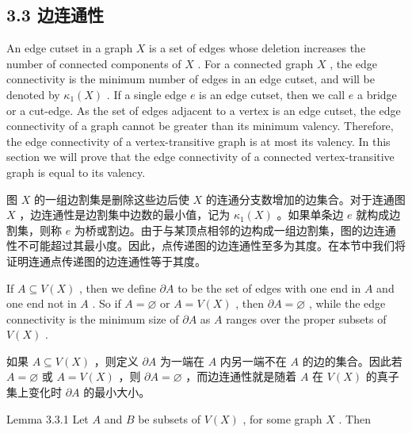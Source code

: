 \documentclass[10pt]{article}
\begin{document}
\begin{tcolorbox}\relax
\section*{3.3 边连通性}
\end{tcolorbox}

An edge cutset in a graph \(X\) is a set of edges whose deletion increases the number of connected components of \(X\) . For a connected graph \(X\) , the edge connectivity is the minimum number of edges in an edge cutset, and will be denoted by \({\kappa }_{1}\left( X\right)\) . If a single edge \(e\) is an edge cutset, then we call \(e\) a bridge or a cut-edge. As the set of edges adjacent to a vertex is an edge cutset, the edge connectivity of a graph cannot be greater than its minimum valency. Therefore, the edge connectivity of a vertex-transitive graph is at most its valency. In this section we will prove that the edge connectivity of a connected vertex-transitive graph is equal to its valency.

\begin{tcolorbox}\relax
图 \(X\) 的一组边割集是删除这些边后使 \(X\) 的连通分支数增加的边集合。对于连通图 \(X\) ，边连通性是边割集中边数的最小值，记为 \({\kappa }_{1}\left( X\right)\) 。如果单条边 \(e\) 就构成边割集，则称 \(e\) 为桥或割边。由于与某顶点相邻的边构成一组边割集，图的边连通性不可能超过其最小度。因此，点传递图的边连通性至多为其度。在本节中我们将证明连通点传递图的边连通性等于其度。
\end{tcolorbox}

If \(A \subseteq  V\left( X\right)\) , then we define \(\partial A\) to be the set of edges with one end in \(A\) and one end not in \(A\) . So if \(A = \varnothing\) or \(A = V\left( X\right)\) , then \(\partial A = \varnothing\) , while the edge connectivity is the minimum size of \(\partial A\) as \(A\) ranges over the proper subsets of \(V\left( X\right)\) .

\begin{tcolorbox}\relax
如果 \(A \subseteq  V\left( X\right)\) ，则定义 \(\partial A\) 为一端在 \(A\) 内另一端不在 \(A\) 的边的集合。因此若 \(A = \varnothing\) 或 \(A = V\left( X\right)\) ，则 \(\partial A = \varnothing\) ，而边连通性就是随着 \(A\) 在 \(V\left( X\right)\) 的真子集上变化时 \(\partial A\) 的最小大小。
\end{tcolorbox}

Lemma 3.3.1 Let \(A\) and \(B\) be subsets of \(V\left( X\right)\) , for some graph \(X\) . Then
\end{document}
